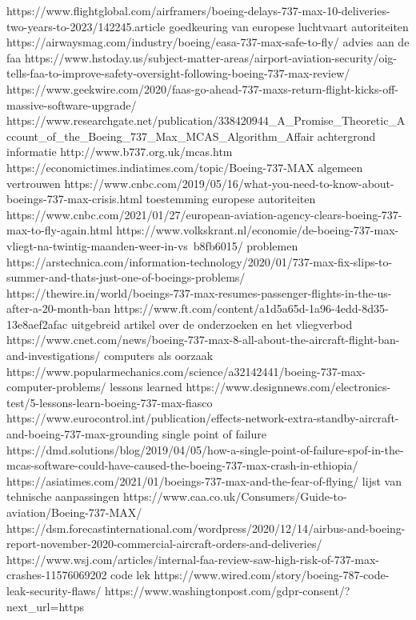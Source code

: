 https://www.flightglobal.com/airframers/boeing-delays-737-max-10-deliveries-two-years-to-2023/142245.article
goedkeuring van europese luchtvaart autoriteiten
https://airwaysmag.com/industry/boeing/easa-737-max-safe-to-fly/
advies aan de faa
https://www.hstoday.us/subject-matter-areas/airport-aviation-security/oig-tells-faa-to-improve-safety-oversight-following-boeing-737-max-review/
https://www.geekwire.com/2020/faas-go-ahead-737-maxs-return-flight-kicks-off-massive-software-upgrade/
https://www.researchgate.net/publication/338420944_A_Promise_Theoretic_Account_of_the_Boeing_737_Max_MCAS_Algorithm_Affair
achtergrond informatie
http://www.b737.org.uk/mcas.htm
https://economictimes.indiatimes.com/topic/Boeing-737-MAX
algemeen vertrouwen
https://www.cnbc.com/2019/05/16/what-you-need-to-know-about-boeings-737-max-crisis.html
toestemming europese autoriteiten
https://www.cnbc.com/2021/01/27/european-aviation-agency-clears-boeing-737-max-to-fly-again.html
https://www.volkskrant.nl/economie/de-boeing-737-max-vliegt-na-twintig-maanden-weer-in-vs~b8fb6015/
problemen
https://arstechnica.com/information-technology/2020/01/737-max-fix-slips-to-summer-and-thats-just-one-of-boeings-problems/
https://thewire.in/world/boeings-737-max-resumes-passenger-flights-in-the-us-after-a-20-month-ban
https://www.ft.com/content/a1d5a65d-1a96-4edd-8d35-13e8aef2afac
uitgebreid artikel over de onderzoeken en het vliegverbod
https://www.cnet.com/news/boeing-737-max-8-all-about-the-aircraft-flight-ban-and-investigations/
computers als oorzaak
https://www.popularmechanics.com/science/a32142441/boeing-737-max-computer-problems/
lessons learned
https://www.designnews.com/electronics-test/5-lessons-learn-boeing-737-max-fiasco
https://www.eurocontrol.int/publication/effects-network-extra-standby-aircraft-and-boeing-737-max-grounding
single point of failure
https://dmd.solutions/blog/2019/04/05/how-a-single-point-of-failure-spof-in-the-mcas-software-could-have-caused-the-boeing-737-max-crash-in-ethiopia/
https://asiatimes.com/2021/01/boeings-737-max-and-the-fear-of-flying/
lijst van tehnische aanpassingen
https://www.caa.co.uk/Consumers/Guide-to-aviation/Boeing-737-MAX/
https://dsm.forecastinternational.com/wordpress/2020/12/14/airbus-and-boeing-report-november-2020-commercial-aircraft-orders-and-deliveries/
https://www.wsj.com/articles/internal-faa-review-saw-high-risk-of-737-max-crashes-11576069202
code lek
https://www.wired.com/story/boeing-787-code-leak-security-flaws/
https://www.washingtonpost.com/gdpr-consent/?next_url=https%
